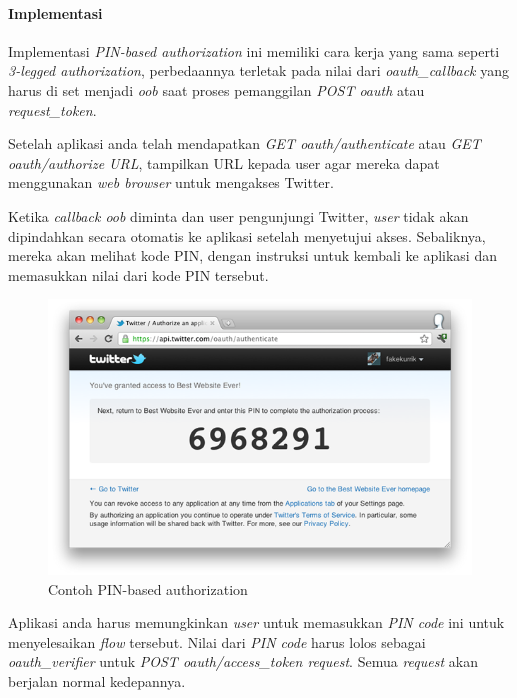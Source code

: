 \paragraph{Implementasi}

Implementasi \textit{PIN-based authorization} ini memiliki cara kerja yang sama seperti \textit{3-legged authorization}, perbedaannya terletak pada nilai dari \textit{oauth\_callback} yang harus di set menjadi \textit{oob} saat proses pemanggilan \textit{POST oauth} atau \textit{request\_token}.

Setelah aplikasi anda telah mendapatkan \textit{GET oauth/authenticate} atau \textit{GET oauth/authorize URL}, tampilkan URL kepada user agar mereka dapat menggunakan \textit{web browser} untuk mengakses Twitter.

Ketika \textit{callback oob} diminta dan user pengunjungi Twitter, \textit{user} tidak akan dipindahkan secara otomatis ke aplikasi setelah menyetujui akses. Sebaliknya, mereka akan melihat kode PIN, dengan instruksi untuk kembali ke aplikasi dan memasukkan nilai dari kode PIN tersebut.

\begin{figure}[H]
\centering
\includegraphics{Gambar/pin.png}
\caption{Contoh PIN-based authorization}
	\label{fig:pin}
\end{figure}

Aplikasi anda harus memungkinkan \textit{user} untuk memasukkan \textit{PIN code} ini untuk menyelesaikan \textit{flow} tersebut. Nilai dari \textit{PIN code} harus lolos sebagai \textit{oauth\_verifier} untuk \textit{POST oauth/access\_token request}. Semua \textit{request} akan berjalan normal kedepannya.



